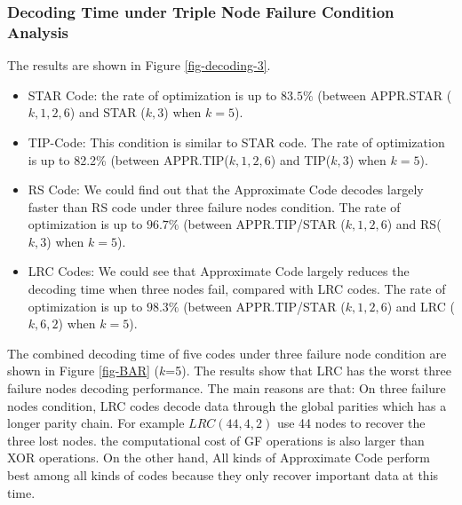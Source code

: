 \documentclass[sigconf]{acmart}
\begin{document}
\subsubsection{Decoding Time under Triple Node Failure Condition Analysis}
The results are shown in Figure \ref{fig-decoding-3}.
\begin{itemize}
    \item STAR Code: the rate of optimization is up to $83.5\%$ (between APPR.STAR ($k,1,2,6$) and STAR ($k,3$) when $k = 5$).
    \item TIP-Code: This condition is similar to STAR code. The rate of optimization is up to 82.2\% (between APPR.TIP($k,1,2,6$) and TIP($k,3$) when $k = 5$).
    \item RS Code: We could find out that the Approximate Code decodes largely faster than RS code under three failure nodes condition. The rate of optimization is up to $96.7\%$ (between APPR.TIP/STAR ($k,1,2,6$) and RS($k,3$) when $k = 5$).
    \item LRC Codes:
    We could see that Approximate Code largely reduces the decoding time when three nodes fail, compared with LRC codes. The rate of optimization is up to $98.3\%$  (between APPR.TIP/STAR ($k,1,2,6$) and LRC ($k, 6, 2$) when $k = 5$).
\end{itemize}

The combined decoding time of five codes under three failure node condition are shown in Figure \ref{fig-BAR} ($k$=5). The results show that LRC has the worst three failure nodes decoding performance. The main reasons are that: On three failure nodes condition, LRC codes decode data through the global parities which has a longer parity chain. For example $LRC (44,4,2)$ use 44 nodes to recover the three lost nodes. the computational cost of GF operations is also larger than XOR operations. On the other hand, All kinds of Approximate Code perform best among all kinds of codes because they only recover important data at this time.
\end{document}
